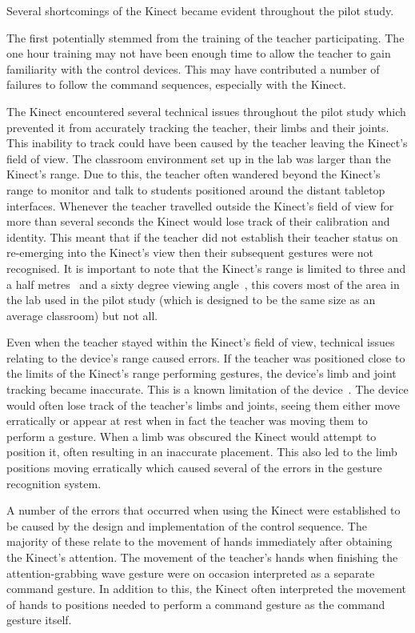 \documentclass[link]{IWCOMP}
\begin{document}
Several shortcomings of the Kinect became evident throughout the pilot study.

The first potentially stemmed from the training of the teacher participating.
The one hour training may not have been enough time to allow the teacher to gain familiarity with the control devices.
This may have contributed a number of failures to follow the command sequences, especially with the Kinect.

The Kinect encountered several technical issues throughout the pilot study which prevented it from accurately tracking the teacher, their limbs and their joints.
This inability to track could have been caused by the teacher leaving the Kinect's field of view.
The classroom environment set up in the lab was larger than the Kinect's range.
Due to this, the teacher often wandered beyond the Kinect's range to monitor and talk to students positioned around the distant tabletop interfaces.
Whenever the teacher travelled outside the Kinect's field of view for more than several seconds the Kinect would lose track of their calibration and identity.
This meant that if the teacher did not establish their teacher status on re-emerging into the Kinect's view then their subsequent gestures were not recognised.
It is important to note that the Kinect's range is limited to three and a half metres~\citep{Maimone2011} and a sixty degree viewing angle~\citep{Stone2011}, this covers most of the area in the lab used in the pilot study (which is designed to be the same size as an average classroom) but not all.

Even when the teacher stayed within the Kinect's field of view, technical issues relating to the device's range caused errors.
If the teacher was positioned close to the limits of the Kinect's range performing gestures, the device's limb and joint tracking became inaccurate.
This is a known limitation of the device~\citep{Mehrotra2011}.
The device would often lose track of the teacher's limbs and joints, seeing them either move erratically or appear at rest when in fact the teacher was moving them to perform a gesture.
When a limb was obscured the Kinect would attempt to position it, often resulting in an inaccurate placement.
This also led to the limb positions moving erratically which caused several of the errors in the gesture recognition system.

A number of the errors that occurred when using the Kinect were established to be caused by the design and implementation of the control sequence.
The majority of these relate to the movement of hands immediately after obtaining the Kinect's attention.
The movement of the teacher's hands when finishing the attention-grabbing wave gesture were on occasion interpreted as a separate command gesture.
In addition to this, the Kinect often interpreted the movement of hands to positions needed to perform a command gesture as the command gesture itself.
\end{document}
